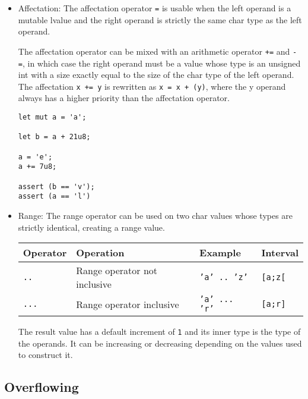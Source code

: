 \begin{itemize}
\item Affectation: The affectation operator \texttt{=} is usable when the left
  operand is a mutable lvalue and the right operand is strictly the same char
  type as the left operand.

  The affectation operator can be mixed with an arithmetic operator \texttt{+=}
  and \texttt{-=}, in which case the right operand must be a value whose type is
  an unsigned int with a size exactly equal to the size of the char type of the
  left operand. The affectation \texttt{x += y} is rewritten as \texttt{x = x +
    (y)}, where the y operand always has a higher priority than the affectation
  operator.

  \begin{lstlisting}[style=coloredverbatim]
let mut a = 'a';

let b = a + 21u8;

a = 'e';
a += 7u8;

assert (b == 'v');
assert (a == 'l')
  \end{lstlisting}

\item Range: The range operator can be used on two char values whose types are
  strictly identical, creating a range value.

  \begin{center}
    \vspace{-10pt}\begin{adjustbox}{max width=1.0\linewidth}
      \begin{tabular}{|l|lll|}
        \hline
        Operator & Operation & Example & Interval\\[0pt]
        \hline
        \hline
        \texttt{..} & Range operator not inclusive & \texttt{'a' .. 'z'} & \texttt{[a;z[}\\[0pt]
            \texttt{...} & Range operator inclusive & \texttt{'a' ... 'r'} & \texttt{[a;r]}\\[0pt]
            \hline
      \end{tabular}
  \end{adjustbox}\end{center}


  The result value has a default increment of \texttt{1} and its inner type is
  the type of the operands. It can be increasing or decreasing depending on the
  values used to construct it.

\end{itemize}

\subsection{Overflowing}
\label{sec:orga9c18c5}

